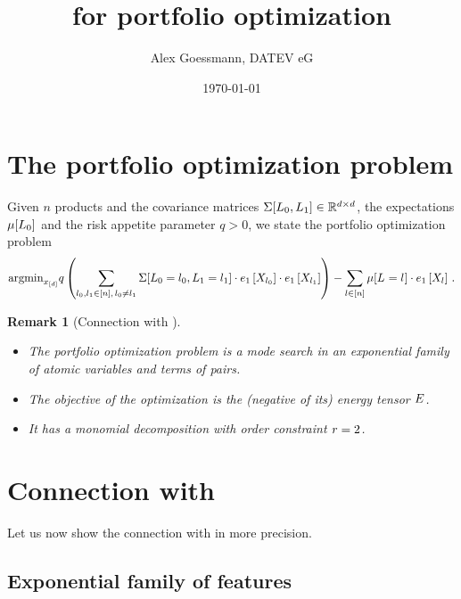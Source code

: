 \documentclass[aps,onecolumn,nofootinbib,pra]{article}
\newtheorem{remark}{Remark}
\begin{document}
\title{\tnreason for portfolio optimization}
\author{Alex Goessmann, DATEV eG}

\maketitle
\date{\today}


\section{The portfolio optimization problem}

\newcommand{\productsnum}{n}

Given $\productsnum$ products and the covariance matrices $\Sigma[L_{0},L_{1}]\in\mathbb{R}^{d\times d}$, the expectations $\mu[L_{0}]$ and the risk appetite parameter $q>0$, we state the portfolio optimization problem
\begin{align}
	\argmin_{\shortcatindices} 
	q \left(\sum_{\selindexof{0},\selindexof{1}\in[\productsnum] , \, \selindexof{0}\neq\selindexof{1}} 
	\Sigma[\indexedselvariableof{0},\indexedselvariableof{1}] \cdot \onehotmapofat{1}{\catvariableof{\selindexof{0}}}\cdot \onehotmapofat{1}{\catvariableof{\selindexof{1}}}\right) 
	- \sum_{\selindex\in[\productsnum]} \mu[\indexedselvariable] \cdot \onehotmapofat{1}{\catvariableof{\selindex}} \, . 
\end{align}

\begin{remark}[Connection with \tnreason]
\begin{itemize}
	\item	The portfolio optimization problem is a mode search in an exponential family of atomic variables and terms of pairs.
	\item The objective of the optimization is the (negative of its) energy tensor $E$.
	 \item It has a monomial decomposition with order constraint $r=2$.
\end{itemize}
\end{remark}

\section{Connection with \tnreason}

Let us now show the connection with \tnreason in more precision.

\subsection{Exponential family of features}
\end{document}
